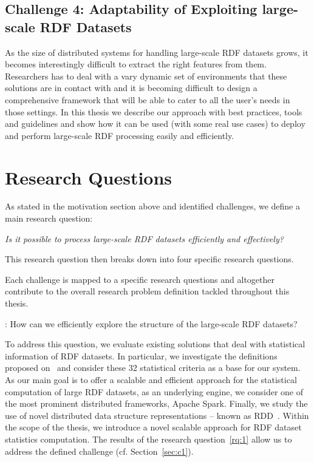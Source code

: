\subsection{Challenge 4: Adaptability of Exploiting large-scale RDF Datasets}
\label{sec:c4}
As the size of distributed systems for handling large-scale \gls{RDF} datasets grows, it becomes interestingly difficult to extract the right features from them.
Researchers has to deal with a vary dynamic set of environments that these solutions are in contact with and it is becoming difficult to design a comprehensive framework that will be able to cater to all the user's needs in those settings.
In this thesis we describe our approach with best practices, tools and guidelines and show how it can be used (with some real use cases) to deploy and perform large-scale \gls{RDF} processing easily and efficiently.


\section{Research Questions}
\label{sec:research-questions}

As stated in the motivation section above and identified challenges, we define a main research question:

\begin{tcolorbox}
\centering
\textit{Is it possible to process large-scale \gls{RDF} datasets efficiently and effectively?}
\end{tcolorbox}

This research question then breaks down into four specific research questions.

Each challenge is mapped to a specific research questions and altogether contribute to the overall research problem definition tackled throughout this thesis.

\begin{tcolorbox}
\textbf{\rqNr[RQ1]\label{rq:1}}: How can we efficiently explore the structure of the large-scale \gls{RDF} datasets?
\end{tcolorbox}

To address this question, we evaluate existing solutions that deal with statistical information of \gls{RDF} datasets.
In particular, we investigate the definitions proposed on~\cite{demter-2012-ekaw} and consider these 32 statistical criteria as a base for our system.
As our main goal is to offer a scalable and efficient approach for the statistical computation of large \gls{RDF} datasets, as an underlying engine, we consider one of the most prominent distributed frameworks, Apache Spark.
Finally, we study the use of novel distributed data structure representations -- known as \gls{RDD}~\cite{zaharia2012resilient}.
Within the scope of the thesis, we introduce a novel scalable approach for \gls{RDF} dataset statistics computation.
The results of the research question~\ref{rq:1} allow us to address the defined challenge (cf. Section~\ref{sec:c1}).

